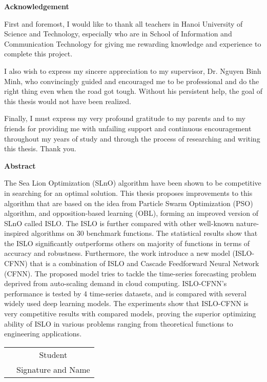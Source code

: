 \documentclass[../main.tex]{subfiles}
\begin{document}
\begin{center}
    \textbf{Acknowledgement}\\
\end{center}
First and foremost, I would like to thank all teachers in Hanoi University of Science and Technology, especially who are in School of Information and Communication Technology for giving me rewarding knowledge and experience to complete this project.

 I also wish to express my sincere appreciation to my supervisor, Dr. Nguyen Binh Minh, who convincingly guided and encouraged me to be professional and do the right thing even when the road got tough. Without his persistent help, the goal of this thesis would not have been realized.

Finally, I must express my very profound gratitude to my parents and to my friends for providing me with unfailing support and continuous encouragement throughout my years of study and through the process of researching and writing this thesis. Thank you. 

\vspace{0.5cm}
\begin{center}
    \textbf{Abstract}\\
\end{center}
The Sea Lion Optimization (SLnO) algorithm have been shown to be competitive in searching for an optimal solution. This thesis proposes improvements to this algorithm that are based on the idea from Particle Swarm Optimization (PSO) algorithm, and opposition-based learning (OBL), forming an improved version of SLnO called ISLO. The ISLO is further compared with other well-known nature-inspired algorithms on 30 benchmark functions. The statistical results show that the ISLO significantly outperforms others on majority of functions in terms of accuracy and robustness. Furthermore, the work introduce a new model (ISLO-CFNN) that is a combination of ISLO and Cascade Feedforward Neural Network (CFNN). The proposed model tries to tackle the time-series forecasting problem deprived from auto-scaling demand in cloud computing. ISLO-CFNN's performance is tested by 4 time-series datasets, and is compared with several widely used deep learning models. The experiments show that ISLO-CFNN is very competitive results with compared models, proving the superior optimizing ability of ISLO in various problems ranging from theoretical functions to engineering applications.
 


\vspace{0.5cm}
\begin{table}[H]
\centering
\begin{tabular}{p{5cm} c}
\multicolumn{1}{c}{\textbf{}} & Student \\
\textbf{}                     & \small{Signature and Name}
\end{tabular}
\end{table}
\end{document}
